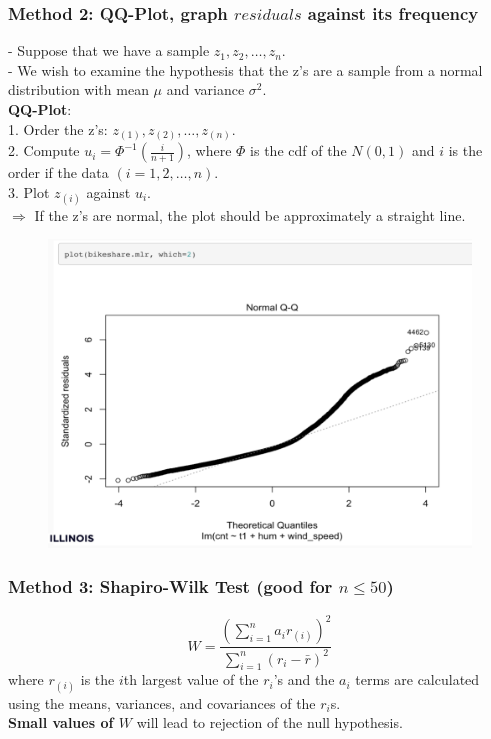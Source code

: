 \documentclass[11pt,a4paper]{article}
\begin{document}
\subsubsection{Method 2: QQ-Plot, graph $residuals$ against its frequency}
- Suppose that we have a sample $z_{1}, z_{2}, \ldots, z_{n}$.\\
- We wish to examine the hypothesis that the z's are a sample from a normal distribution with mean $\mu$ and variance $\sigma^{2}$.\\
\textbf{QQ-Plot}:\\
1. Order the z's: $z_{(1)}, z_{(2)}, \ldots, z_{(n)}$.\\
2. Compute $u_{i}=\Phi^{-1}\left(\frac{i}{n+1}\right)$, where $\Phi$ is the cdf of the $N(0,1)$ and $i$ is the order if the data $(i=1,2, \ldots, n)$.\\
3. Plot $z_{(i)}$ against $u_{i}$.\\
$\Rightarrow$ If the z's are normal, the plot should be approximately a straight line.
\begin{center}\begin{figure}[htbp]
    \centering
    \includegraphics[scale=0.7]{check7.png}
    \caption{}
    \label{}
\end{figure}\end{center}

\subsubsection{Method 3: Shapiro-Wilk Test (good for $n \leq 50$)}
$$W=\frac{(\sum_{i=1}^n a_i r_{(i)})^2}{\sum_{i=1}^n(r_i-\bar{r})^2}$$
where $r_{(i)}$ is the $i$th largest value of the $r_i$’s and the $a_i$ terms are calculated using the means, variances, and covariances of the $r_i$s.\\
\textbf{Small values of $W$} will lead to rejection of the null hypothesis.
\end{document}
